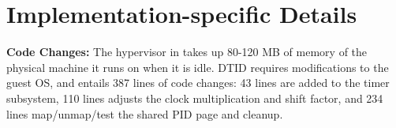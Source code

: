 \section{Implementation-specific Details}
\vspace{-0.05in}

{\bf Code Changes:}
The hypervisor in \na takes up 80-120 MB of memory of the physical machine it runs on when it is idle.
DTID requires modifications to the guest OS, and entails 387 lines of code changes: 43 lines are added to the timer subsystem, 110 lines adjusts the clock multiplication and shift factor, and 234 lines map/unmap/test the shared PID page and cleanup.

